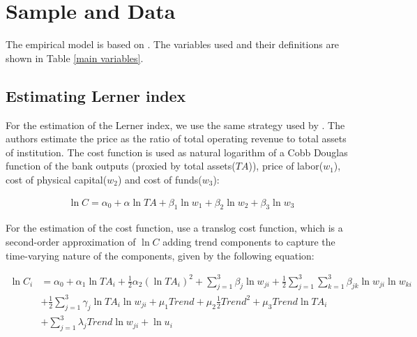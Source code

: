 \chapter{Sample and Data}

The empirical model is based on . The variables used and their definitions are shown in Table \ref{main variables}. 

\section{Estimating Lerner index}

For the estimation of the Lerner index, we use the same strategy used by . The authors estimate the price as the ratio of total operating revenue to total assets of institution. The cost function is used as natural logarithm of a Cobb Douglas function of the bank outputs (proxied by total assets($TA$)), price of labor($w_1$), cost of physical capital($w_2$) and cost of funds($w_3$):

\begin{equation}
    \begin{aligned}
        \ln C = \alpha_0 + \alpha \ln TA + \beta_1 \ln w_1 + \beta_2 \ln w_2 + \beta_3 \ln w_3
    \end{aligned}
\end{equation}

For the estimation of the cost function,  use a translog cost function, which is a second-order approximation of $\ln C$ adding trend components to capture the time-varying nature of the components, given by the following equation:

\begin{equation}
    \begin{aligned}
        \ln C_i & = \alpha_0 + \alpha_1 \ln TA_i + \frac{1}{2} \alpha_2 (\ln TA_i)^2 + \sum_{j=1}^{3} \beta_j \ln w_{ji} + \frac{1}{2} \sum_{j=1}^{3} \sum_{k=1}^{3} \beta_{jk} \ln w_{ji} \ln w_{ki} \\ & + \frac{1}{2} \sum_{j=1}^{3} \gamma_j \ln TA_i \ln w_{ji} + \mu_1 \textit{Trend} + \mu_2 \frac{1}{2} \textit{Trend}^2 + \mu_3 \textit{Trend} \ln TA_i \\ & + \sum_{j=1}^{3} \lambda_j \textit{Trend} \ln w_{ji} + \ln u_i
    \end{aligned}
\end{equation}


